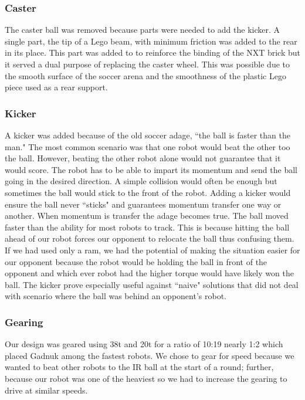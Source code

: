 \documentclass{article}
\begin{document}
\subsubsection{Caster}
The caster ball was removed because parts were needed to add the kicker. A single part, the tip of a Lego beam, with minimum friction was added to the rear in its place. This part was added to to reinforce the binding of the NXT brick but it served a dual purpose of replacing the caster wheel. This was possible due to the smooth surface of the soccer arena and the smoothness of the plastic Lego piece used as a rear support.

\subsubsection{Kicker}
A kicker was added because of the old soccer adage, ``the ball is faster than the man." The most common scenario was that one robot would beat the other too the ball. However, beating the other robot alone would not guarantee that it would score. The robot has to be able to impart its momentum and send the ball going in the desired direction. A simple collision would often be enough but sometimes the ball would stick to the front of the robot. Adding a kicker would ensure the ball never ``sticks" and guarantees momentum transfer one way or another. When momentum is transfer the adage becomes true. The ball moved faster than the ability for most robots to track. This is because hitting the ball ahead of our robot forces our opponent to relocate the ball thus confusing them. If we had used only a ram, we had the potential of making the situation easier for our opponent because the robot would be holding the ball in front of the opponent and which ever robot had the higher torque would have likely won the ball. The kicker prove especially useful against ``naive" solutions that did not deal with scenario where the ball was behind an opponent's robot.

\subsubsection{Gearing}
Our design was geared using 38t and 20t for a ratio of 10:19 nearly 1:2 which placed Gadnuk among the fastest robots. We chose to gear for speed because we wanted to beat other robots to the IR ball at the start of a round; further, because our robot was one of the heaviest so we had to increase the gearing to drive at similar speeds. 
\end{document}
